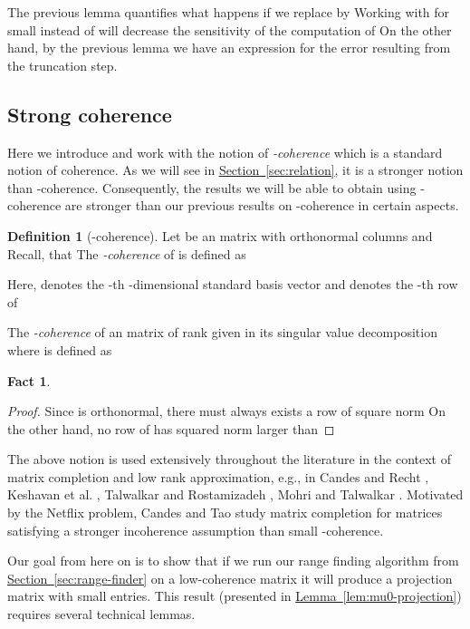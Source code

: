 \documentclass[letterpaper,11pt]{article}
\newtheorem{fact}[theorem]{Fact}
\theoremstyle{definition}
\newtheorem{definition}[theorem]{Definition}
\newcommand{\definitionlabel}[1]{\label{def:#1}}
\newcommand{\lemmaref}[1]{\hyperref[lem:#1]{Lemma~\ref{lem:#1}}}
\newcommand{\sectionref}[1]{\hyperref[sec:#1]{Section~\ref{sec:#1}}}
\begin{document}
The previous lemma quantifies what happens if we replace  by
 Working with  for small  instead of 
will decrease the sensitivity of the computation of   On the
other hand, by the previous lemma we have an expression for the error
resulting from the truncation step.

\subsection{Strong coherence}

Here we introduce and work with the notion of \emph{-coherence} which
is a standard notion of coherence. As we will see in \sectionref{relation}, it
is a stronger notion than -coherence. Consequently, the results we will be
able to obtain using -coherence are stronger than our previous results
on -coherence in certain aspects.

\begin{definition}[-coherence]
\definitionlabel{mu0}
Let  be an  matrix with orthonormal columns and 
Recall, that  The \emph{-coherence} of  is defined as

Here,  denotes the -th -dimensional standard basis vector and
 denotes the -th row of 

The \emph{-coherence} of an  matrix  of rank  given in
its singular value decomposition  where  is
defined as 
\end{definition}

\begin{fact}

\end{fact}
\begin{proof}
Since  is orthonormal, there must always exists a row of square norm 
On the other hand, no row of  has squared norm larger than 
\end{proof}

The above notion is used extensively throughout the literature in the context
of matrix completion and low rank approximation, e.g., in Candes and Recht
\cite{CandesR09}, Keshavan et al. \cite{KeshavanMO10}, Talwalkar and
Rostamizadeh \cite{TalwalkarR10}, Mohri and Talwalkar \cite{MohriT10}.
Motivated by the Netflix problem, Candes and Tao \cite{CandesT10} study matrix
completion for matrices satisfying a stronger incoherence assumption than
small -coherence.

Our goal from here on is to show that if we run our range finding algorithm from
\sectionref{range-finder} on a low-coherence matrix it will produce a
projection matrix with small entries. This result (presented in
\lemmaref{mu0-projection}) requires several technical lemmas.
\end{document}

